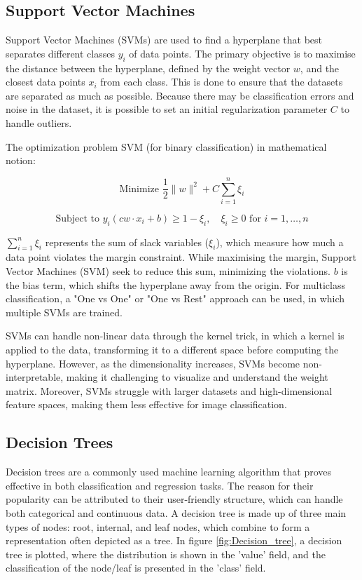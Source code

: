 \subsection{Support Vector Machines}

Support Vector Machines (SVMs) \cite{boser1992training} are used to find a hyperplane that best separates different classes $y_i$ of data points. The primary objective is to maximise the distance between the hyperplane, defined by the weight vector ${w}$, and the closest data points $x_i$ from each class. This is done to ensure that the datasets are separated as much as possible. Because there may be classification errors and noise in the dataset, it is possible to set an initial regularization parameter $C$ to handle outliers.

The optimization problem SVM (for binary classification) in mathematical notion:

$$\text{Minimize } \frac{1}{2} \|{w}\|^2 + C \sum_{i=1}^{n} \xi_i$$

$$\text{Subject to } y_i (c{w} \cdot x_i + b) \geq 1 - \xi_i, \quad \xi_i \geq 0 \text{ for } i = 1, \ldots, n$$

$\sum_{i=1}^{n} \xi_i$ represents the sum of slack variables ($\xi_i$), which measure how much a data point violates the margin constraint. While maximising the margin, Support Vector Machines (SVM) seek to reduce this sum, minimizing the violations. $ b $ is the bias term, which shifts the hyperplane away from the origin. For multiclass classification, a "One vs One" or "One vs Rest" approach can be used, in which multiple SVMs are trained.

SVMs can handle non-linear data through the kernel trick, in which a kernel is applied to the data, transforming it to a different space before computing the hyperplane.  However, as the dimensionality increases, SVMs become non-interpretable, making it challenging to visualize and understand the weight matrix. Moreover, SVMs struggle with larger datasets and high-dimensional feature spaces, making them less effective for image classification.


\subsection{Decision Trees}
\label{decision_tree}


Decision trees are a commonly used machine learning algorithm that proves effective in both classification and regression tasks. The reason for their popularity can be attributed to their user-friendly structure, which can handle both categorical and continuous data. A decision tree is made up of three main types of nodes: root, internal, and leaf nodes, which combine to form a representation often depicted as a tree. In figure \ref{fig:Decision_tree}, a decision tree is plotted, where the distribution is shown in the 'value' field, and the classification of the node/leaf is presented in the 'class' field.

